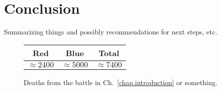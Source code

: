 \chapter{Conclusion}
\label{chap.conclusion}

Summarizing things and possibly recommendations for next steps, etc.
%
\lipsum[4-5]
%
\begin{figure}[h!]
	\centering
	\begin{tabular}{|c|c|c|} 
		\hline
		\textbf{Red}	& \textbf{Blue}	& \textbf{Total}	\\
		\hline
		$\approx2400$	& $\approx5000$	& $\approx7400$		\\
		\hline
	\end{tabular}
	\caption{Deaths from the battle in Ch.~\ref{chap.introduction} or something.}
\end{figure}

\cleardoublepage



